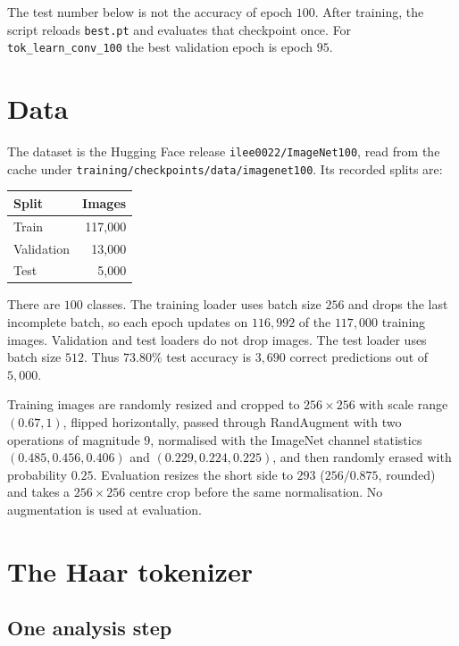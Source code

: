 \documentclass[11pt]{article}
\begin{document}
The test number below is not the accuracy of epoch $100$. After training, the
script reloads \texttt{best.pt} and evaluates that checkpoint once. For
\texttt{tok\_learn\_conv\_100} the best validation epoch is epoch $95$.

\section{Data}

The dataset is the Hugging Face release \texttt{ilee0022/ImageNet100}, read
from the cache under \texttt{training/checkpoints/data/imagenet100}. Its
recorded splits are:

\begin{center}
\begin{tabular}{@{}lr@{}}
\toprule
Split & Images \\
\midrule
Train & 117{,}000 \\
Validation & 13{,}000 \\
Test & 5{,}000 \\
\bottomrule
\end{tabular}
\end{center}

There are $100$ classes. The training loader uses batch size $256$ and drops
the last incomplete batch, so each epoch updates on $116{,}992$ of the
$117{,}000$ training images. Validation and test loaders do not drop images.
The test loader uses batch size $512$. Thus $73.80\%$ test accuracy is
$3{,}690$ correct predictions out of $5{,}000$.

Training images are randomly resized and cropped to $256\times256$ with scale
range $(0.67,1)$, flipped horizontally, passed through RandAugment with two
operations of magnitude $9$, normalised with the ImageNet channel statistics
$(0.485,0.456,0.406)$ and $(0.229,0.224,0.225)$, and then randomly erased with
probability $0.25$. Evaluation resizes the short side to $293$
($256/0.875$, rounded) and takes a $256\times256$ centre crop before the same
normalisation. No augmentation is used at evaluation.

\section{The Haar tokenizer}

\subsection{One analysis step}
\end{document}
